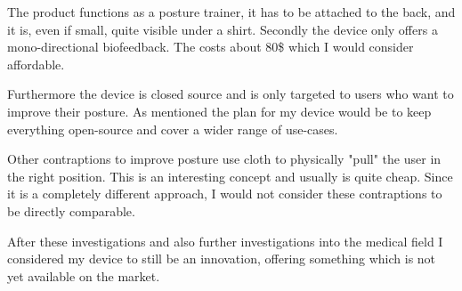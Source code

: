 The product functions as a posture trainer, it has to be attached to the back, and it is, even if small, quite visible under a shirt. Secondly the device only offers a mono-directional biofeedback. \cite{HowToImp2:online} The costs about 80\$ which I would consider affordable.

Furthermore the device is closed source and is only targeted to users who want to improve their posture. As mentioned the plan for my device would be to keep everything open-source and cover a wider range of use-cases. 

Other contraptions to improve posture use cloth to physically "pull" the user in the right position. This is an interesting concept and usually is quite cheap. Since it is a completely different approach, I would not consider these contraptions to be directly comparable.

After these investigations and also further investigations into the medical field I considered my device to still be an innovation, offering something which is not yet available on the market.